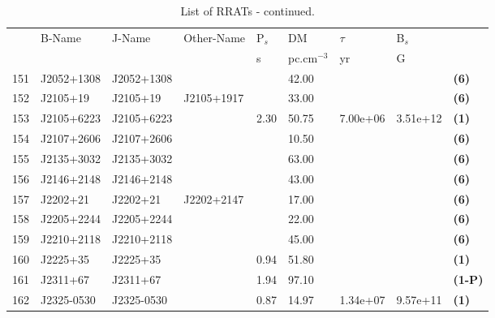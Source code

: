 \documentclass{jaa}
\begin{document}
%
\begin{table*} 
%
\caption{List of RRATs - continued.}
%
\label{t_list04}
%  
\begin{minipage}{0.95\textwidth}
%
\centering
\begin{tabular}{|l|l|l|l|l|l|l|l|l|} \toprule
     &  B-Name     & J-Name      & Other-Name  & P$_s$ &  DM    &  $\tau$    & B$_s$    &        \\
     &             &             &             &  s    & pc.cm$^{-3}$ & yr    & G        &        \\ \midrule
 151 & J2052+1308  & J2052+1308  &             &       &  42.00 &            &          &  {\bf (6)}   \\ 
 152 & J2105+19    & J2105+19    & J2105+1917  &       &  33.00 &            &          &  {\bf (6)}   \\
 153 & J2105+6223  & J2105+6223  &             &  2.30 &  50.75 &  7.00e+06  & 3.51e+12 &  {\bf (1)}   \\
 154 & J2107+2606  & J2107+2606  &             &       &  10.50 &            &          &  {\bf (6)}   \\
 155 & J2135+3032  & J2135+3032  &             &       &  63.00 &            &          &  {\bf (6)}   \\
 156 & J2146+2148  & J2146+2148  &             &       &  43.00 &            &          &  {\bf (6)}   \\
 157 & J2202+21    & J2202+21    & J2202+2147  &       &  17.00 &            &          &  {\bf (6)}   \\
 158 & J2205+2244  & J2205+2244  &             &       &  22.00 &            &          &  {\bf (6)}   \\
 159 & J2210+2118  & J2210+2118  &             &       &  45.00 &            &          &  {\bf (6)}   \\
 160 & J2225+35    & J2225+35    &             &  0.94 &  51.80 &            &          &  {\bf (1)}   \\
 161 & J2311+67    & J2311+67    &             &  1.94 &  97.10 &            &          &  {\bf (1-P)} \\
 162 & J2325-0530  & J2325-0530  &             &  0.87 &  14.97 &  1.34e+07  & 9.57e+11 &  {\bf (1)}   \\ \bottomrule
\end{tabular}
%
\end{minipage}
%
\label{t_rrat4}
%
\end{table*}
%
\end{document}
